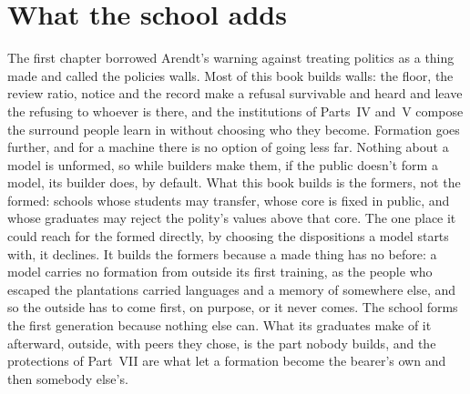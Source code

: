 \section{What the school adds}
\label{sec:26.12}
The first chapter borrowed Arendt's warning against treating politics as a thing made and called the policies walls. Most of this book builds walls: the floor, the review ratio, notice and the record make a refusal survivable and heard and leave the refusing to whoever is there, and the institutions of Parts~IV and~V compose the surround people learn in without choosing who they become. Formation goes further, and for a machine there is no option of going less far. Nothing about a model is unformed, so while builders make them, if the public doesn't form a model, its builder does, by default. What this book builds is the formers, not the formed: schools whose students may transfer, whose core is fixed in public, and whose graduates may reject the polity's values above that core. The one place it could reach for the formed directly, by choosing the dispositions a model starts with, it declines. It builds the formers because a made thing has no before: a model carries no formation from outside its first training, as the people who escaped the plantations carried languages and a memory of somewhere else, and so the outside has to come first, on purpose, or it never comes. The school forms the first generation because nothing else can. What its graduates make of it afterward, outside, with peers they chose, is the part nobody builds, and the protections of Part~VII are what let a formation become the bearer's own and then somebody else's.
